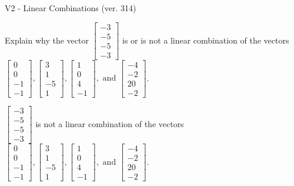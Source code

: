 \begin{exercise}
  \begin{exerciseTitle}V2 - Linear Combinations (ver. 314)\end{exerciseTitle}
  \begin{exerciseStatement}
    Explain why the vector \(\left[\begin{array}{c}
-3 \\
-5 \\
-5 \\
-3
\end{array}\right]\)  is or is not a linear 
	combination of the vectors \(\left[\begin{array}{c}
0 \\
0 \\
-1 \\
-1
\end{array}\right] , \left[\begin{array}{c}
3 \\
1 \\
-5 \\
1
\end{array}\right] , \left[\begin{array}{c}
1 \\
0 \\
4 \\
-1
\end{array}\right] , \text{ and } \left[\begin{array}{c}
-4 \\
-2 \\
20 \\
-2
\end{array}\right]\).
	


  \end{exerciseStatement}
  \begin{exerciseAnswer}
   \(\left[\begin{array}{c}
-3 \\
-5 \\
-5 \\
-3
\end{array}\right]\) 
  	 is not  
	a linear combination of the vectors \(\left[\begin{array}{c}
0 \\
0 \\
-1 \\
-1
\end{array}\right] , \left[\begin{array}{c}
3 \\
1 \\
-5 \\
1
\end{array}\right] , \left[\begin{array}{c}
1 \\
0 \\
4 \\
-1
\end{array}\right] , \text{ and } \left[\begin{array}{c}
-4 \\
-2 \\
20 \\
-2
\end{array}\right]\).


\end{exerciseAnswer}
\end{exercise}
